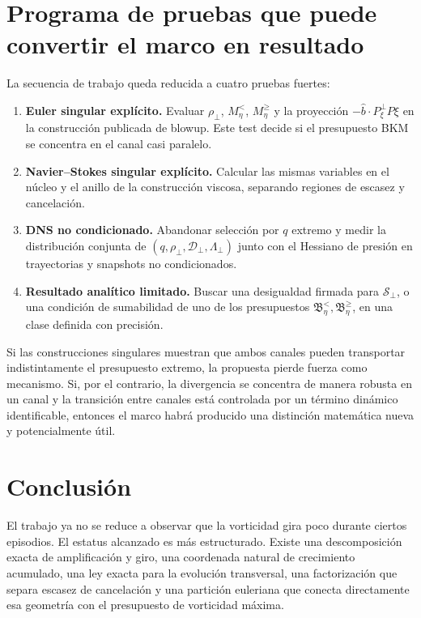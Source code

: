 \documentclass[11pt]{article}
\newcommand{\Pperp}{P_{\xi}^{\perp}}
\newcommand{\rhoT}{\rho_{\perp}}
\newcommand{\Scal}{\mathcal S}
\newcommand{\Dcal}{\mathcal D_{\perp}}
\newcommand{\Lcal}{\Lambda_{\perp}}
\begin{document}
\section{Programa de pruebas que puede convertir el marco en resultado}

La secuencia de trabajo queda reducida a cuatro pruebas fuertes:

\begin{enumerate}[leftmargin=1.7em]
\item \textbf{Euler singular explícito.} Evaluar $\rhoT$, $M_\eta^{<}$, $M_\eta^{\ge}$ y la proyección $-\widehat b\cdot\Pperp P\xi$ en la construcción publicada de blowup. Este test decide si el presupuesto BKM se concentra en el canal casi paralelo.
\item \textbf{Navier--Stokes singular explícito.} Calcular las mismas variables en el núcleo y el anillo de la construcción viscosa, separando regiones de escasez y cancelación.
\item \textbf{DNS no condicionado.} Abandonar selección por $q$ extremo y medir la distribución conjunta de $(q,\rhoT,\Dcal,\Lcal)$ junto con el Hessiano de presión en trayectorias y snapshots no condicionados.
\item \textbf{Resultado analítico limitado.} Buscar una desigualdad firmada para $\Scal_\perp$, o una condición de sumabilidad de uno de los presupuestos $\mathfrak B_\eta^{<},\mathfrak B_\eta^{\ge}$, en una clase definida con precisión.
\end{enumerate}

Si las construcciones singulares muestran que ambos canales pueden transportar indistintamente el presupuesto extremo, la propuesta pierde fuerza como mecanismo. Si, por el contrario, la divergencia se concentra de manera robusta en un canal y la transición entre canales está controlada por un término dinámico identificable, entonces el marco habrá producido una distinción matemática nueva y potencialmente útil.

\section{Conclusión}

El trabajo ya no se reduce a observar que la vorticidad gira poco durante ciertos episodios. El estatus alcanzado es más estructurado. Existe una descomposición exacta de amplificación y giro, una coordenada natural de crecimiento acumulado, una ley exacta para la evolución transversal, una factorización que separa escasez de cancelación y una partición euleriana que conecta directamente esa geometría con el presupuesto de vorticidad máxima.
\end{document}
